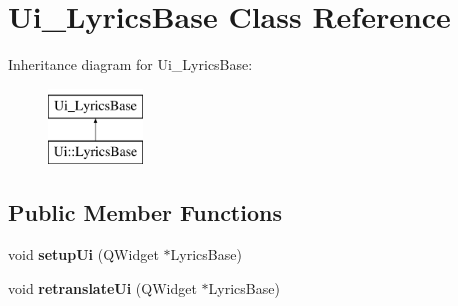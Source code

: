 \hypertarget{class_ui___lyrics_base}{}\section{Ui\+\_\+\+Lyrics\+Base Class Reference}
\label{class_ui___lyrics_base}
Inheritance diagram for Ui\+\_\+\+Lyrics\+Base\+:\begin{figure}[H]
\begin{center}
\leavevmode
\includegraphics[height=2.000000cm]{class_ui___lyrics_base}
\end{center}
\end{figure}
\subsection*{Public Member Functions}
\begin{DoxyCompactItemize}
\item 
\mbox{\label{class_ui___lyrics_base_afe2ffd8f8f40e85875c8164ff3dd16dc}} 
void {\bfseries setup\+Ui} (Q\+Widget $\ast$Lyrics\+Base)
\item 
\mbox{\label{class_ui___lyrics_base_a1a6500f74e432d3a7750cf779a32c4d5}} 
void {\bfseries retranslate\+Ui} (Q\+Widget $\ast$Lyrics\+Base)
\end{DoxyCompactItemize}
